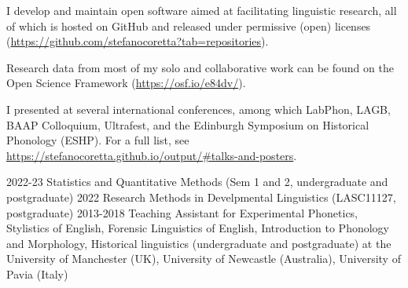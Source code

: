 \documentclass[9pt]{developercv} %
\begin{document}


\begin{entrylist}
	\entry
		{\hspace{1em}}
		{\textnormal{I develop and maintain open software aimed at facilitating linguistic research, all of which is hosted on GitHub and released under permissive (open) licenses (\url{https://github.com/stefanocoretta?tab=repositories}).}}
		{}
		{}
\end{entrylist}



\begin{entrylist}
	\entry
		{\hspace{1em}}
		{\textnormal{Research data from most of my solo and collaborative work can be found on the Open Science Framework (\url{https://osf.io/e84dv/}).}}
		{}
		{}
\end{entrylist}



\begin{entrylist}
	\entry
		{\hspace{1em}}
		{\textnormal{I presented at several international conferences, among which LabPhon, LAGB, BAAP Colloquium, Ultrafest, and the Edinburgh Symposium on Historical Phonology (ESHP). For a full list, see \url{https://stefanocoretta.github.io/output/\#talks-and-posters}.}}
		{}
		{}
\end{entrylist}



\begin{entrylist}
	\entry
		{2022-23}
		{Statistics and Quantitative Methods \textnormal{(Sem 1 and 2, undergraduate and postgraduate)}}
		{}
		{}
	\entry
		{2022}
		{Research Methods in Develpmental Linguistics \textnormal{(LASC11127, postgraduate)}}
		{}
		{}
	\entry
	  {2013-2018}
	  {\textnormal{Teaching Assistant for} Experimental Phonetics, Stylistics of English, Forensic Linguistics of English, Introduction to Phonology and Morphology, Historical linguistics \textnormal{(undergraduate and postgraduate) at the University of Manchester (UK), University of Newcastle (Australia), University of Pavia (Italy)}}
	  {}
	  {}
\end{entrylist}
\end{document}
